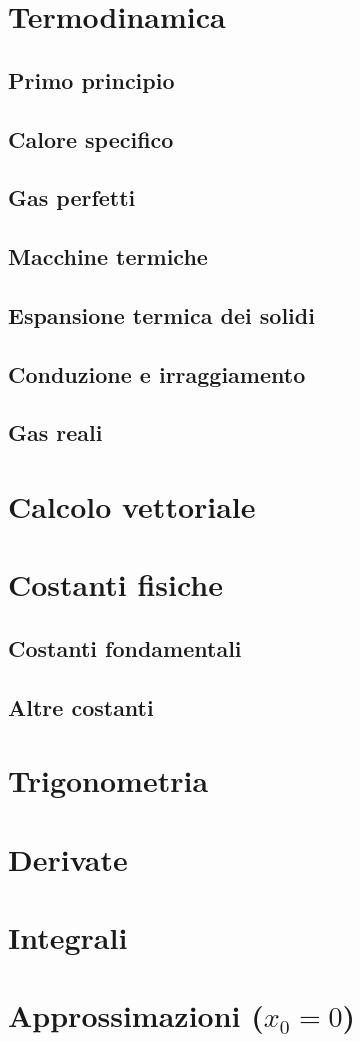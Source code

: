 \documentclass[70pt]{article}
\begin{document}
\begin{small}
\begin{multicols}{3}
\section{Termodinamica}
	\subsection{Primo principio}
	\subsection{Calore specifico}
	\subsection{Gas perfetti}
	\subsection{Macchine termiche}
	\subsection{Espansione termica dei solidi}
	\subsection{Conduzione e irraggiamento}
	\subsection{Gas reali}
\section{Calcolo vettoriale}
\section{Costanti fisiche}
	\subsection{Costanti fondamentali}
	\subsection{Altre costanti}
\section{Trigonometria}
\section{Derivate}
\section{Integrali}
\section{Approssimazioni ($x_0 = 0$)}

	\end{multicols}
	\end{small}
\end{document}
